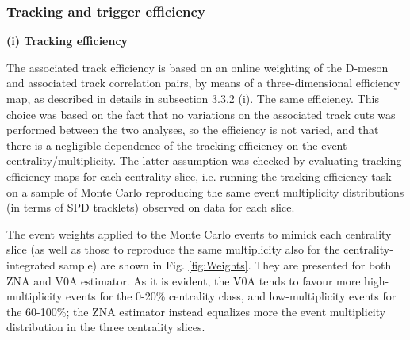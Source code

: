 \subsubsection{Tracking and trigger efficiency}

{\bf (i) Tracking efficiency}

The associated track efficiency is based on an online weighting of the D-meson and associated track correlation pairs, by means of a three-dimensional efficiency map, as described in details in subsection 3.3.2 (i).
The same efficiency.
This choice was based on the fact that no variations on the associated track cuts was performed between the two analyses, so the efficiency is not varied, and that there is a negligible dependence of the tracking efficiency on the event centrality/multiplicity.
The latter assumption was checked by evaluating tracking efficiency maps for each centrality slice, i.e. running the tracking efficiency task on a sample of Monte Carlo reproducing the same event multiplicity distributions (in terms of SPD tracklets) observed on data for each slice.

The event weights applied to the Monte Carlo events to mimick each centrality slice (as well as those to reproduce the same multiplicity also for the centrality-integrated sample) are shown in Fig. \ref{fig:Weights}. They are presented for both ZNA and V0A estimator. As it is evident, the V0A tends to favour more high-multiplicity events for the 0-20\% centrality class, and low-multiplicity events for the 60-100\%; the ZNA estimator instead equalizes more the event multiplicity distribution in the three centrality slices.

